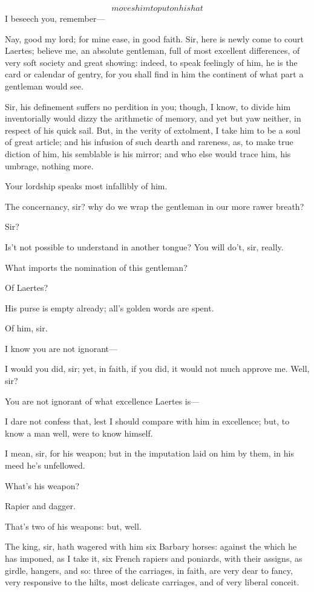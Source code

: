 \documentclass[11pt]{book}
\begin{document}
\1	\[moves him to put on his hat\] I beseech you, re\-mem\-ber---

	Nay, good my lord; for mine ease, in good faith.
	Sir, here is newly come to court Laertes; believe
	me, an absolute gentleman, full of most excellent
	differences, of very soft society and great showing:
	indeed, to speak feelingly of him, he is the card or
	calendar of gentry, for you shall find in him the
	continent of what part a gentleman would see.

\1	Sir, his definement suffers no perdition in you;
	though, I know, to divide him inventorially would
	dizzy the arithmetic of memory, and yet but yaw
	neither, in respect of his quick sail. But, in the
	verity of extolment, I take him to be a soul of
	great article; and his infusion of such dearth and
	rareness, as, to make true diction of him, his
	semblable is his mirror; and who else would trace
	him, his umbrage, nothing more.

	Your lordship speaks most infallibly of him.

\1	The concernancy, sir? why do we wrap the gentleman
	in our more rawer breath?

	Sir?

\6	Is't not possible to understand in another tongue?
	You will do't, sir, really.

\1	What imports the nomination of this gentleman?

	Of Laertes?

\6	His purse is empty already; all's golden words are spent.

\1	Of him, sir.

	I know you are not ignorant---

\1	I would you did, sir; yet, in faith, if you did,
	it would not much approve me. Well, sir?

	You are not ignorant of what excellence Laertes is---

\1	I dare not confess that, lest I should compare with
	him in excellence; but, to know a man well, were to
	know himself.

	I mean, sir, for his weapon; but in the imputation
	laid on him by them, in his meed he's unfellowed.

\1	What's his weapon?

	Rapier and dagger.

\1	That's two of his weapons: but, well.

	The king, sir, hath wagered with him six Barbary
	horses: against the which he has imponed, as I take
	it, six French rapiers and poniards, with their
	assigns, as girdle, hangers, and so: three of the
	carriages, in faith, are very dear to fancy, very
	responsive to the hilts, most delicate carriages,
	and of very liberal conceit.
\end{document}
